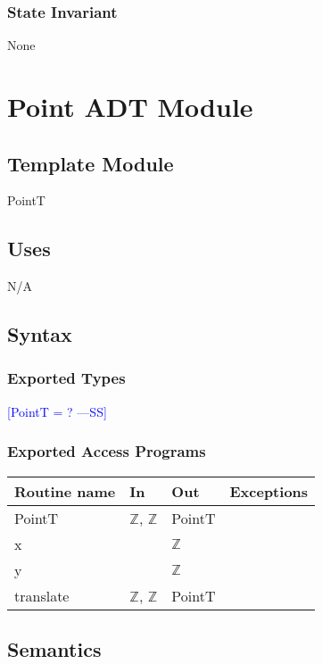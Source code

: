 \documentclass[12pt]{article}
\newcommand{\authornote}[3]{\textcolor{#1}{[#3 ---#2]}}
\newcommand{\authornote}[3]{}
\newcommand{\wss}[1]{\authornote{blue}{SS}{#1}}
\begin{document}
\subsubsection* {State Invariant}

None

\newpage

\section* {Point ADT Module}

\subsection*{Template Module}

PointT

\subsection* {Uses}

N/A

\subsection* {Syntax}

\subsubsection* {Exported Types}

\wss{PointT = ?}

\subsubsection* {Exported Access Programs}

\begin{tabular}{| l | l | l | l |}
\hline
\textbf{Routine name} & \textbf{In} & \textbf{Out} & \textbf{Exceptions}\\
\hline
PointT & $\mathbb{Z}$, $\mathbb{Z}$ & PointT & \\
\hline
x & ~ & $\mathbb{Z}$ & ~\\
\hline
y & ~ & $\mathbb{Z}$ & ~\\
\hline
translate & $\mathbb{Z}$, $\mathbb{Z}$ & PointT & ~\\
\hline
\end{tabular}

\subsection* {Semantics}
\end{document}
